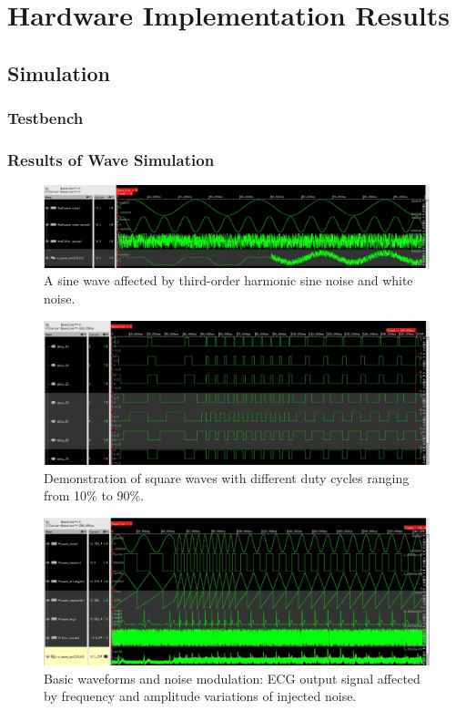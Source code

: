 \section{Hardware Implementation Results}

\subsection{Simulation}

\subsubsection{Testbench}



\subsubsection{Results of Wave Simulation}
\begin{figure}[H]
	\centering
	\includegraphics[width=.9\linewidth]{./my-chapters/my-images/simulation/sin_add_noise_sin.jpg}
	\caption{A sine wave affected by third-order harmonic sine noise and white noise.}
\end{figure}

\begin{figure}[H]
	\centering
	\includegraphics[width=.9\linewidth]{./my-chapters/my-images/simulation/duty_cycle.jpg}
	\caption{Demonstration of square waves with different duty cycles ranging from 10\% to 90\%.}
\end{figure}

\begin{figure}[H]
	\centering
	\includegraphics[width=.9\linewidth]{./my-chapters/my-images/simulation/waveform_with_noise.jpg}
	\caption{Basic waveforms and noise modulation: ECG output signal affected by frequency and amplitude variations of injected noise.}
\end{figure}

